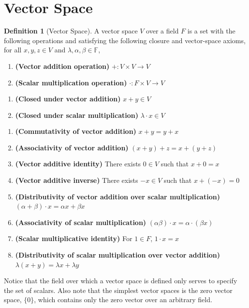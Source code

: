 \documentclass[12pt]{report}
\numberwithin{equation}{section}
\theoremstyle{definition}
\newtheorem{definition}[theorem]{Definition}
\begin{document}
\section{Vector Space}

\begin{definition}[Vector Space]
	A vector space $ V $ over a field $ F $ is a set with the following operations and satisfying the following closure and vector-space axioms, for all $ x,y,z\in V $ and $ \lambda, \alpha, \beta \in \mathbb{F} $,
	
	\begin{enumerate}[label=O\arabic*, start=1]   
		\item \textbf{(Vector addition operation)} $ +: V\times V \to V $
		\item \textbf{(Scalar multiplication operation) } $ \cdot: F\times V \to V $
	\end{enumerate}
	\begin{enumerate}[label=C\arabic*, start=1]   
		\item \textbf{(Closed under vector addition)} $ x+y \in V$
		\item \textbf{(Closed under scalar multiplication) } $ \lambda\cdot x  \in V$
	\end{enumerate}
	\begin{enumerate}[label=A\arabic*, start=1]   
		\item \textbf{(Commutativity of vector addition)} $ x+y = y+x $
		\item \textbf{(Associativity of vector addition) } $ (x+y)+z=x+(y+z) $
		\item \textbf{(Vector additive identity)} There exists $ 0\in V $ such that $ x+0=x  $ 
		\item \textbf{(Vector additive inverse)} There exists $ -x \in V$ such that $ x+(-x)=0 $
		\item \textbf{(Distributivity of vector addition over scalar multiplication)} \\$(\alpha  + \beta)\cdot x = \alpha x+ \beta x$
		\item \textbf{(Associativity of scalar multiplication)} $ (\alpha\beta)\cdot x = \alpha\cdot(\beta x) $
		\item \textbf{(Scalar multiplicative identity)} For $ 1\in F$,  $ 1\cdot x=x  $ 
		\item \textbf{(Distributivity of scalar multiplication over vector addition)} \\$ \lambda(x+y) = \lambda x + \lambda y $
	\end{enumerate}

	Notice that the field over which a vector space is defined only serves to specify the set of scalars. Also note that the simplest vector spaces is the zero vector space, $ \{0\} $, which contains only the zero vector over an arbitrary field.
		
	\label{def:vector_space}
\end{definition}
\end{document}
